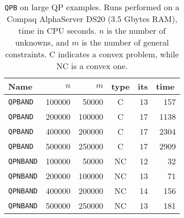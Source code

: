 \documentclass[twoside]{article}
\begin{document}
\begin{table}[ht]
\begin{center}
\begin{tabular}[c]{|lrrc|rr|}
\hline
Name      & $n$ & $m$ & type & its & time\, \\
\hline
{\tt QPBAND}  & 100000 & 50000  & C &   13  & {157} \\
{\tt QPBAND}  & 200000 & 100000 & C &   17  & {1138} \\
{\tt QPBAND}  & 400000 & 200000 & C &   17  & {2304} \\
{\tt QPBAND}  & 500000 & 250000 & C &   17  & {2909} \\
\hline
{\tt QPNBAND}  & 100000 & 50000  & NC &   12  & {32} \\
{\tt QPNBAND}  & 200000 & 100000 & NC &   13  & {71} \\
{\tt QPNBAND}  & 400000 & 200000 & NC &   14  & {156} \\
{\tt QPNBAND}  & 500000 & 250000 & NC &   13  & {181} \\
\hline
\end{tabular}
\end{center}
\caption{\label{figa} {\tt QPB} on large QP examples.
Runs performed on a Compaq AlphaServer DS20 (3.5 Gbytes RAM),
time in CPU seconds. $n$ is the number of unknowns, and 
$m$ is the number of general constraints. 
C indicates a convex problem, while NC is a convex one.}
\end{table}
\end{document}
